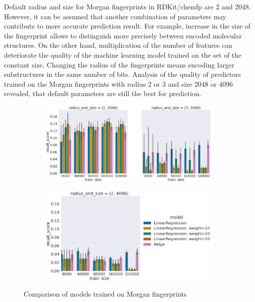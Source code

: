 Default radius and size for Morgan fingerprints in RDKit/chemfp are 2 and 2048.
However, it can be assumed that another combination of parameters may contribute to more accurate prediction result.
For example, increase in the size of the fingerprint allows to distinguish more precisely between encoded molecular structures. On the other hand, multiplication of the number of features can deteriorate the quality of the machine learning model trained on the set of the constant size.
Changing the radius of the fingerprints means encoding larger substructures  in the same number of bits.
Analysis of the quality of predictors trained on the Morgan fingerprints with radius 2 or 3 and size 2048 or 4096 revealed, that default parameters are still the best for prediction.
\begin{figure}[H]
\centering
\begin{subfigure}{\textwidth}
\includegraphics[scale = 0.4]{Images/DifferentMorgan1.jpg}
\end{subfigure}
\hfill\break
\begin{subfigure}{\textwidth}
\includegraphics[scale = 0.55]{Images/DifferentMorgan2.jpg}
\end{subfigure}
\caption{Comparison of models trained on Morgan fingerprints}
\end{figure}


